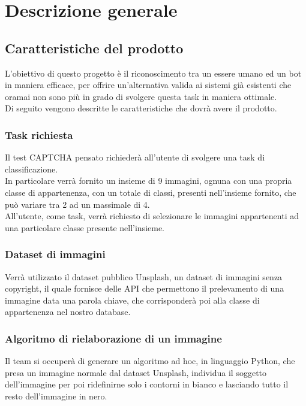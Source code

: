 \section{Descrizione generale}

\subsection{Caratteristiche del prodotto}
L’obiettivo di questo progetto è il riconoscimento tra un essere umano ed un bot in maniera efficace, per offrire un'alternativa valida ai sistemi già esistenti che oramai non sono più in grado di svolgere questa task in maniera ottimale.\\

Di seguito vengono descritte le caratteristiche che dovrà avere il prodotto.

\subsubsection{Task richiesta}
Il test CAPTCHA pensato richiederà all’utente di svolgere una task di classificazione.\\
In particolare verrà fornito un insieme di 9 immagini, ognuna con una propria classe di appartenenza, con un totale di classi, presenti nell’insieme fornito, che può variare tra 2 ad un massimale di 4.\\
All’utente, come task, verrà richiesto di selezionare le immagini appartenenti ad una particolare classe presente nell’insieme.

\subsubsection{Dataset di immagini}
Verrà utilizzato il dataset pubblico Unsplash, un dataset di immagini senza copyright, il quale fornisce delle API che permettono il prelevamento di una immagine data una parola chiave, che corrisponderà poi alla classe di appartenenza nel nostro database.

\subsubsection{Algoritmo di rielaborazione di un immagine}
Il team si occuperà di generare un algoritmo ad hoc, in linguaggio Python, che presa un immagine normale dal dataset Unsplash, individua il soggetto dell’immagine per poi ridefinirne solo i contorni in bianco e lasciando tutto il resto dell’immagine in nero.  

